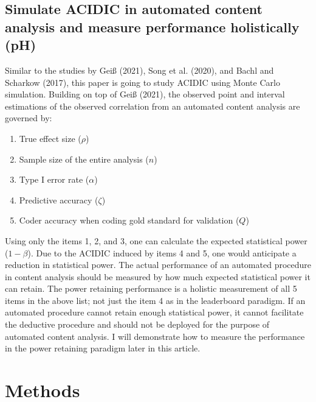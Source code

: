\documentclass[english,man,floatsintext]{apa6}
\providecommand{\tightlist}{%
  \setlength{\itemsep}{0pt}\setlength{\parskip}{0pt}}
\begin{document}
\hypertarget{simulate-acidic-in-automated-content-analysis-and-measure-performance-holistically-ph}{%
\subsection{Simulate ACIDIC in automated content analysis and measure performance holistically (pH)}\label{simulate-acidic-in-automated-content-analysis-and-measure-performance-holistically-ph}}

Similar to the studies by Geiß (2021), Song et al. (2020), and Bachl and Scharkow (2017), this paper is going to study ACIDIC using Monte Carlo simulation. Building on top of Geiß (2021), the observed point and interval estimations of the observed correlation from an automated content analysis are governed by:

\begin{enumerate}
\def\labelenumi{\arabic{enumi}.}
\tightlist
\item
  True effect size (\(\rho\))
\item
  Sample size of the entire analysis (\(n\))
\item
  Type I error rate (\(\alpha\))
\item
  Predictive accuracy (\(\zeta\))
\item
  Coder accuracy when coding gold standard for validation (\(Q\))
\end{enumerate}

Using only the items 1, 2, and 3, one can calculate the expected statistical power (\(1 - \beta\)). Due to the ACIDIC induced by items 4 and 5, one would anticipate a reduction in statistical power. The actual performance of an automated procedure in content analysis should be measured by how much expected statistical power it can retain. The power retaining performance is a holistic measurement of all 5 items in the above list; not just the item 4 as in the leaderboard paradigm. If an automated procedure cannot retain enough statistical power, it cannot facilitate the deductive procedure and should not be deployed for the purpose of automated content analysis. I will demonstrate how to measure the performance in the power retaining paradigm later in this article.

\hypertarget{methods}{%
\section{Methods}\label{methods}}
\end{document}
